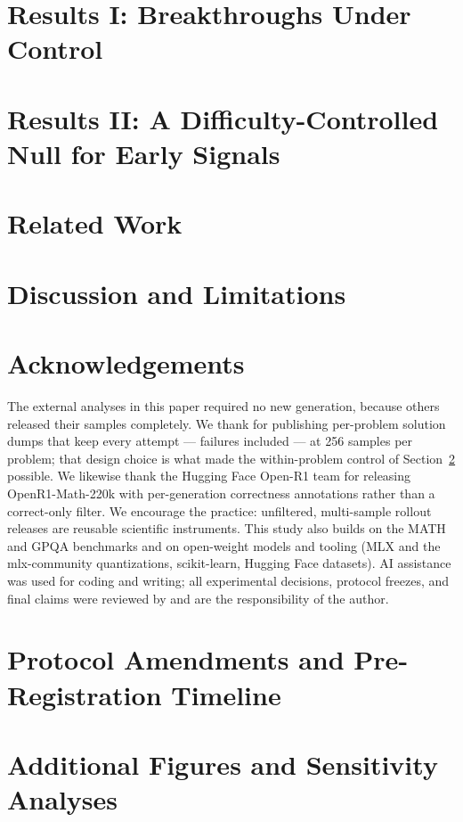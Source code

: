 \documentclass[11pt]{article}
\begin{document}
\section{Results I: Breakthroughs Under Control}\label{sec:results-regimes}


\section{Results II: A Difficulty-Controlled Null for Early Signals}\label{sec:results-prediction}


\section{Related Work}\label{sec:related}


\section{Discussion and Limitations}\label{sec:discussion}


\section*{Acknowledgements}
The external analyses in this paper required no new generation, because
others released their samples completely. We thank
\citet{singhi2025solveverify} for publishing per-problem solution dumps
that keep every attempt --- failures included --- at 256 samples per
problem; that design choice is what made the within-problem control of
Section~\ref{sec:results-prediction} possible. We likewise thank the
Hugging Face Open-R1 team for releasing OpenR1-Math-220k
\citep{openr1math} with per-generation correctness annotations rather
than a correct-only filter. We encourage the practice: unfiltered,
multi-sample rollout releases are reusable scientific instruments. This
study also builds on the MATH \citep{hendrycks2021math} and GPQA
\citep{rein2023gpqa} benchmarks and on open-weight models and tooling
(MLX and the mlx-community quantizations, scikit-learn, Hugging Face
datasets). AI assistance was used for coding and writing; all
experimental decisions, protocol freezes, and final claims were reviewed
by and are the responsibility of the author.




\appendix
\section{Protocol Amendments and Pre-Registration Timeline}\label{app:amendments}


\section{Additional Figures and Sensitivity Analyses}\label{app:extra}

\end{document}
